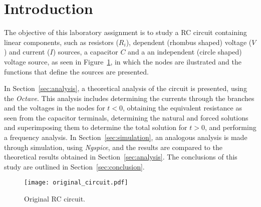 \section{Introduction}
\label{sec:introduction}

The objective of this laboratory assignment is to study a RC circuit containing linear components, 
such as resistors ($R_i$), dependent (rhombus shaped) voltage ($V$) and current ($I$) 
sources, a capacitor $C$ and a an independent (circle shaped) voltage source, as seen in Figure~\ref{fig:OG_circ}, in which the nodes are ilustrated and the functions that define the sources are presented.


In Section~\ref{sec:analysis}, a theoretical analysis of the circuit is
presented, using the \textit{Octave}. This analysis includes determining the currents through the branches and the voltages in the nodes for $t<0$, obtaining the equivalent resistance as seen from the capacitor terminals, determining the natural and forced solutions and superimposing them to determine the total solution for $t>0$, and performing a frequency analysis. 
In Section~\ref{sec:simulation}, an analogous analysis is made through simulation, using \textit{Ngspice}, and the results are compared to the theoretical results obtained in Section~\ref{sec:analysis}. The conclusions of this study are outlined in
Section~\ref{sec:conclusion}.


\begin{figure}[h] \centering
    \texttt{[image: original\_circuit.pdf]}
    \caption{Original RC circuit.}
    \label{fig:OG_circ}
    \end{figure}
    



